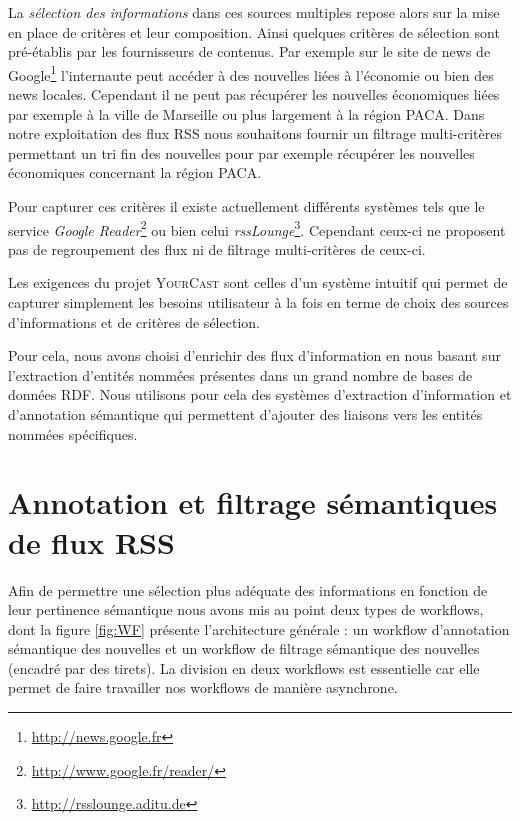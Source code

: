 \documentclass[]{ciel}
\newcommand{\Y}[0]{\textsc{YourCast}\xspace}
\begin{document}
La \textit{sélection des informations} dans ces sources multiples repose alors sur la mise en place de critères et leur composition. 
Ainsi  quelques critères de sélection sont  pré-établis par les fournisseurs de contenus.  Par exemple sur le site de news de Google\footnote{\url{http://news.google.fr}} l'internaute peut accéder à des nouvelles liées à l'économie ou bien des news locales. Cependant il ne peut pas récupérer les nouvelles économiques liées par exemple à la ville de Marseille ou plus largement à la région PACA. Dans notre exploitation des flux RSS nous souhaitons fournir un filtrage multi-critères permettant un tri fin des nouvelles pour par exemple récupérer les nouvelles économiques concernant la région PACA. 

Pour capturer ces critères il existe actuellement différents systèmes tels que le service \textsl{Google Reader}\footnote{\url{http://www.google.fr/reader/}} ou bien celui \textsl{rssLounge}\footnote{\url{http://rsslounge.aditu.de}}. Cependant ceux-ci ne proposent pas de regroupement des flux ni de filtrage multi-critères de ceux-ci. 

Les exigences du  projet \Y sont celles d'un système intuitif qui permet de capturer simplement les besoins utilisateur à la fois en terme de choix des sources d'informations et de critères de sélection.

Pour cela, nous avons choisi d'enrichir des flux d'information en nous basant sur l'extraction d'entités nommées \cite{Charton2011} présentes dans un grand nombre de bases de données RDF. Nous utilisons pour cela des systèmes d'extraction d'information et d'annotation sémantique qui permettent d'ajouter des liaisons vers les entités nommées spécifiques.



\section{Annotation et filtrage sémantiques de flux RSS}
\label{sect:miseEnOuvre}
Afin de permettre une sélection plus adéquate des informations en fonction de leur pertinence sémantique nous avons mis au point deux types de workflows, dont la figure \ref{fig:WF} présente  l'architecture générale : un workflow d'annotation sémantique des nouvelles et un workflow de filtrage sémantique des nouvelles (encadré par des tirets). La division en deux workflows est essentielle car elle permet de faire travailler nos workflows de manière asynchrone.
\end{document}
